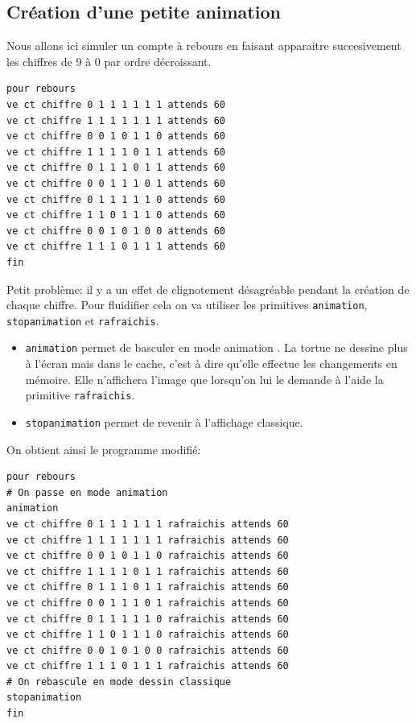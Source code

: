 \subsection{Création d'une petite animation}
\noindent Nous allons ici simuler un compte à rebours en faisant apparaitre succesivement les chiffres de 9 à 0 par ordre décroissant.
\begin{verbatim}
pour rebours
ve ct chiffre 0 1 1 1 1 1 1 attends 60
ve ct chiffre 1 1 1 1 1 1 1 attends 60
ve ct chiffre 0 0 1 0 1 1 0 attends 60
ve ct chiffre 1 1 1 1 0 1 1 attends 60
ve ct chiffre 0 1 1 1 0 1 1 attends 60
ve ct chiffre 0 0 1 1 1 0 1 attends 60
ve ct chiffre 0 1 1 1 1 1 0 attends 60
ve ct chiffre 1 1 0 1 1 1 0 attends 60
ve ct chiffre 0 0 1 0 1 0 0 attends 60
ve ct chiffre 1 1 1 0 1 1 1 attends 60
fin
\end{verbatim}
Petit problème: il y a un effet de clignotement désagréable pendant la création de chaque chiffre. Pour fluidifier cela on va utiliser les primitives \texttt{animation}, \texttt{stopanimation} et \texttt{rafraichis}.\\
\begin{itemize}
\item \texttt{animation} permet de basculer en mode \og animation \fg. La tortue ne dessine plus à l'écran mais dans le cache, c'est à dire qu'elle effectue les changements en mémoire. Elle n'affichera l'image que lorsqu'on lui le demande à l'aide la primitive \texttt{rafraichis}.
\item  \texttt{stopanimation} permet de revenir à l'affichage classique.
\end{itemize}
On obtient ainsi le programme modifié:
\begin{verbatim}
pour rebours
# On passe en mode animation
animation
ve ct chiffre 0 1 1 1 1 1 1 rafraichis attends 60
ve ct chiffre 1 1 1 1 1 1 1 rafraichis attends 60
ve ct chiffre 0 0 1 0 1 1 0 rafraichis attends 60
ve ct chiffre 1 1 1 1 0 1 1 rafraichis attends 60
ve ct chiffre 0 1 1 1 0 1 1 rafraichis attends 60
ve ct chiffre 0 0 1 1 1 0 1 rafraichis attends 60
ve ct chiffre 0 1 1 1 1 1 0 rafraichis attends 60
ve ct chiffre 1 1 0 1 1 1 0 rafraichis attends 60
ve ct chiffre 0 0 1 0 1 0 0 rafraichis attends 60
ve ct chiffre 1 1 1 0 1 1 1 rafraichis attends 60
# On rebascule en mode dessin classique
stopanimation
fin
\end{verbatim}
